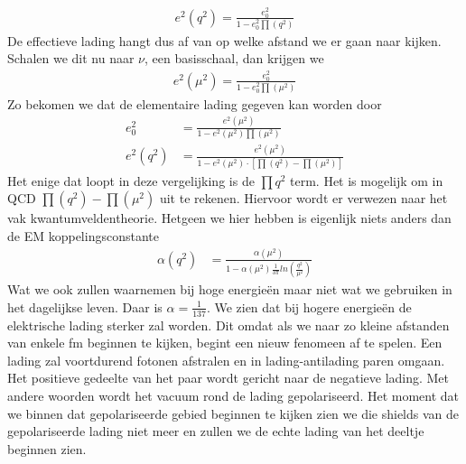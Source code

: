 \documentclass[../main.tex]{subfiles}
\begin{document}
\begin{equation}
    \begin{aligned}
        \label{eq:running_lading}
        e^2(q^2) = \frac{e_0^2}{1-e_0^2\prod(q^2)} 
    \end{aligned}
\end{equation}
De effectieve lading hangt dus af van op welke afstand we er gaan naar kijken. Schalen we dit nu naar $\nu$, een basisschaal, dan krijgen we
\begin{equation}
    \begin{aligned}
        \label{eq:running_lading_1}
        e^2(\mu^2) = \frac{e_0^2}{1-e_0^2\prod(\mu^2)} 
    \end{aligned}
\end{equation}
Zo bekomen we dat de elementaire lading gegeven kan worden door
\begin{equation}
    \begin{aligned}
        \label{eq:running_lading_2}
        e_0^2 &= \frac{e^2(\mu^2)}{1-e^2(\mu^2)\prod(\mu^2)} \\
        e^2(q^2) &= \frac{e^2(\mu^2)}{1-e^2(\mu^2)\cdot [\prod(q^2)-\prod(\mu^2)]}
    \end{aligned}
\end{equation}
Het enige dat loopt in deze vergelijking is de $\prod{q^2}$ term. Het is mogelijk om in QCD $\prod(q^2)-\prod(\mu^2)$ uit te rekenen. Hiervoor wordt er verwezen naar het vak kwantumveldentheorie. Hetgeen we hier hebben is eigenlijk niets anders dan de EM koppelingsconstante
\begin{equation}
    \begin{aligned}
        \label{eq:em_koppelingsconstante}
        \alpha(q^2) &= \frac{\alpha(\mu^2)}{1-\alpha(\mu^2) \frac{1}{3\pi} ln\left( \frac{q^2}{\mu^2} \right)}
    \end{aligned}
\end{equation}
Wat we ook zullen waarnemen bij hoge energieën maar niet wat we gebruiken in het dagelijkse leven. Daar is $\alpha = \frac{1}{137}$. We zien dat bij hogere energieën de elektrische lading sterker zal worden. Dit omdat als we naar zo kleine afstanden van enkele fm beginnen te kijken, begint een nieuw fenomeen af te spelen. Een lading zal voortdurend fotonen afstralen en in lading-antilading paren omgaan. Het positieve gedeelte van het paar wordt gericht naar de negatieve lading. Met andere woorden wordt het vacuum rond de lading gepolariseerd. Het moment dat we binnen dat gepolariseerde gebied beginnen te kijken zien we die shields van de gepolariseerde lading niet meer en zullen we de echte lading van het deeltje beginnen zien.
\end{document}
